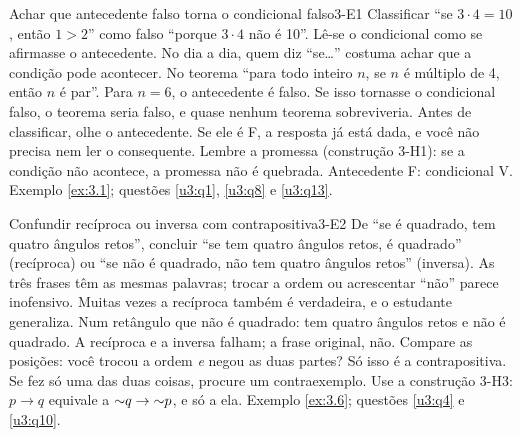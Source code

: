 \ErrosComuns

\begin{erro}{Achar que antecedente falso torna o condicional falso}{3-E1}
 Classificar \enquote{se $3\cdot4=10$, então $1>2$} como falso \enquote{porque $3\cdot4$ não é 10}.
 Lê-se o condicional como se afirmasse o antecedente. No dia a dia, quem diz \enquote{se\ldots} costuma achar que a condição pode acontecer.
 No teorema \enquote{para todo inteiro $n$, se $n$ é múltiplo de 4, então $n$ é par}. Para $n=6$, o antecedente é falso. Se isso tornasse o condicional falso, o teorema seria falso, e quase nenhum teorema sobreviveria.
 Antes de classificar, olhe o antecedente. Se ele é F, a resposta já está dada, e você não precisa nem ler o consequente.
 Lembre a promessa (construção 3-H1): se a condição não acontece, a promessa não é quebrada. Antecedente F: condicional V.
 Exemplo \ref{ex:3.1}; questões \ref{u3:q1}, \ref{u3:q8} e \ref{u3:q13}.
\end{erro}

\begin{erro}{Confundir recíproca ou inversa com contrapositiva}{3-E2}
 De \enquote{se é quadrado, tem quatro ângulos retos}, concluir \enquote{se tem quatro ângulos retos, é quadrado} (recíproca) ou \enquote{se não é quadrado, não tem quatro ângulos retos} (inversa).
 As três frases têm as mesmas palavras; trocar a ordem ou acrescentar \enquote{não} parece inofensivo. Muitas vezes a recíproca também é verdadeira, e o estudante generaliza.
 Num retângulo que não é quadrado: tem quatro ângulos retos e não é quadrado. A recíproca e a inversa falham; a frase original, não.
 Compare as posições: você trocou a ordem \emph{e} negou as duas partes? Só isso é a contrapositiva. Se fez só uma das duas coisas, procure um contraexemplo.
 Use a construção 3-H3: $p\rightarrow q$ equivale a ${{\sim}}q\rightarrow{{\sim}}p$, e só a ela.
 Exemplo \ref{ex:3.6}; questões \ref{u3:q4} e \ref{u3:q10}.
\end{erro}

